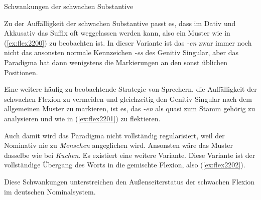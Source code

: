 \begin{Vertiefung}{Schwankungen der schwachen Substantive}
  \label{absref:9w238r467}

\noindent Zu der Auffälligkeit der schwachen Substantive passt es, dass im Dativ und Akkusativ das Suffix oft weggelassen werden kann, also ein Muster wie in (\ref{ex:flex2200}) zu beobachten ist.
In dieser Variante ist das \textit{-en} zwar immer noch nicht das ansonsten normale Kennzeichen \textit{-es} des Genitiv Singular, aber das Paradigma hat dann wenigstens die Markierungen an den sonst üblichen Positionen.

\begin{exe}
  \ex\label{ex:flex2200}
  \begin{xlist}
  \end{xlist}
\end{exe}

Eine weitere häufig zu beobachtende Strategie von Sprechern, die Auffälligkeit der schwachen Flexion zu vermeiden und gleichzeitig den Genitiv Singular nach dem allgemeinen Muster zu markieren, ist es, das \textit{-en} als quasi zum Stamm gehörig zu analysieren und wie in (\ref{ex:flex2201}) zu flektieren.

\begin{exe}
  \ex\label{ex:flex2201}
  \begin{xlist}
  \end{xlist}
\end{exe}

Auch damit wird das Paradigma nicht vollständig regularisiert, weil der Nominativ nie zu \Ast\textit{Menschen} angeglichen wird.
Ansonsten wäre das Muster dasselbe wie bei \textit{Kuchen}.
Es existiert eine weitere Variante.
Diese Variante ist der vollständige Übergang des Worts in die gemischte Flexion, also (\ref{ex:flex2202}).

\begin{exe}
  \ex\label{ex:flex2202}
  \begin{xlist}
  \end{xlist}
\end{exe}

Diese Schwankungen unterstreichen den Außenseiterstatus der schwachen Flexion im deutschen Nominalsystem.

\end{Vertiefung}


